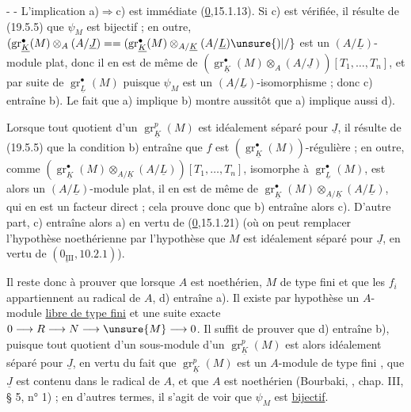-  -
L'implication a)$\Rightarrow$c) est immédiate  (\uline{0},15.1.13). Si c) est vérifiée, il résulte de (19.5.5) que $\psi_M$ est bijectif ; en outre,
$(\operatorname{gr}_{\underline K}^\bullet(M)\otimes_A(A/\underline J)=
=(\operatorname{gr}_{\underline K}^\bullet(M)\otimes_{A/\underline K}(A/\underline L)\unsure{)|/}$ est un $(A/\underline L)$-module plat, donc il en est de même de
$(\operatorname{gr}_{\underline K}^\bullet(M)\otimes_A(A/\underline J))[T_1,\ldots,T_n]$, et par suite de $\operatorname{gr}_{\underline L}^\bullet(M)$ puisque $\psi_M$ est un $(A/\underline L)$-isomorphisme ; donc c) entraîne b). Le fait que a) implique b) montre aussitôt que a) implique aussi d).

Lorsque tout quotient d'un $\operatorname{gr}_{\underline K}^p(M)$ est idéalement séparé pour $\underline J$, il résulte de (19.5.5) que la condition b) entraîne que $f$ est $(\operatorname{gr}_{\underline K}^\bullet(M))$-régulière ; en outre, comme
$(\operatorname{gr}_{\underline K}^\bullet(M)\otimes_{A/\underline K}(A/\underline L))[T_1,\ldots,T_n]$, isomorphe à $\operatorname{gr}_{\underline L}^\bullet(M)$, est alors un $(A/\underline L)$-module plat,  il en est  de même de
$\operatorname{gr}_{\underline K}^\bullet(M)\otimes_{A/\underline K}(A/\underline L)$, qui en est un facteur direct ; cela prouve donc que b) entraîne alors c). D'autre part, c) entraîne alors a) en vertu de (\uline{0},15.1.21) (où on peut remplacer l'hypothèse noethérienne par l'hypothèse que $M$ est idéalement séparé pour $\underline J$, en vertu de $(\underline{0_{\mathrm{III}}},10.2.1)$).

Il reste donc à prouver que lorsque $A$ est noethérien, $M$ de type fini et que les  $f_i$ appartiennent au radical de $A$, d) entraîne a). Il existe par hypothèse un $A$-module \uline{libre de type fini}  et une suite exacte
$0\longrightarrow R\longrightarrow N\longrightarrow\unsure{M}\longrightarrow0$.
Il suffit de prouver que d) entraîne b), puisque tout quotient d'un sous-module d'un $\operatorname{gr}_{\underline K}^p(M)$ est alors idéalement séparé pour $\underline J$, en vertu du fait que $\operatorname{gr}_{\underline K}^p(M)$ est un $A$-module de type fini , que $\underline J$ est contenu dans le radical de $A$,  et que $A$ est noethérien (Bourbaki, , chap. III, § 5, n° 1) ; en d'autres termes, il s'agit de voir que $\psi_M$ est \uline{bijectif}.
